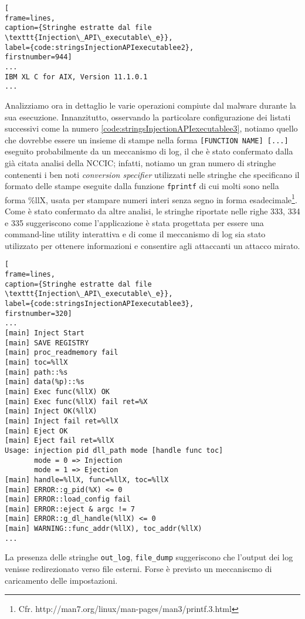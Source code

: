 \documentclass[10pt,a4paper, titlepage]{report}
\begin{document}
\begin{lstlisting}[
frame=lines, 
caption={Stringhe estratte dal file \texttt{Injection\_API\_executable\_e}}, 
label={code:stringsInjectionAPIexecutablee2},
firstnumber=944]
...
IBM XL C for AIX, Version 11.1.0.1
...
\end{lstlisting}

Analizziamo ora in dettaglio le varie operazioni compiute dal malware durante la sua esecuzione.
Innanzitutto, osservando la particolare configurazione dei listati successivi come la numero \ref{code:stringsInjectionAPIexecutablee3}, notiamo quello che dovrebbe essere un insieme di stampe nella forma \texttt{[FUNCTION NAME] [...]} eseguito probabilmente da un meccanismo di log, il che è stato confermato dalla già citata analisi della NCCIC; infatti, notiamo un gran numero di stringhe contenenti i ben noti \textit{conversion specifier} utilizzati nelle stringhe che specificano il formato delle stampe eseguite dalla funzione \texttt{fprintf} di cui molti sono nella forma \%llX, usata per stampare numeri interi senza segno in forma esadecimale\footnote{Cfr. http://man7.org/linux/man-pages/man3/printf.3.html}. 
Come è stato confermato da altre analisi, le stringhe riportate nelle righe 333, 334 e 335 suggeriscono come l'applicazione è stata progettata per essere una command-line utility interattiva e di come il meccanismo di log sia stato utilizzato per ottenere informazioni e consentire agli attaccanti un attacco mirato.

\begin{lstlisting}[
frame=lines, 
caption={Stringhe estratte dal file \texttt{Injection\_API\_executable\_e}}, 
label={code:stringsInjectionAPIexecutablee3},
firstnumber=320]
...
[main] Inject Start
[main] SAVE REGISTRY
[main] proc_readmemory fail
[main] toc=%llX
[main] path::%s
[main] data(%p)::%s
[main] Exec func(%llX) OK
[main] Exec func(%llX) fail ret=%X
[main] Inject OK(%llX)
[main] Inject fail ret=%llX
[main] Eject OK
[main] Eject fail ret=%llX
Usage: injection pid dll_path mode [handle func toc]
       mode = 0 => Injection
       mode = 1 => Ejection
[main] handle=%llX, func=%llX, toc=%llX
[main] ERROR::g_pid(%X) <= 0
[main] ERROR::load_config fail
[main] ERROR::eject & argc != 7
[main] ERROR::g_dl_handle(%llX) <= 0
[main] WARNING::func_addr(%llX), toc_addr(%llX)
...
\end{lstlisting}

La presenza delle stringhe \texttt{out\_log}, \texttt{file\_dump} suggeriscono che l'output dei log venisse redirezionato verso file esterni. Forse è previsto un meccaniscmo di caricamento delle impostazioni.
\end{document}
